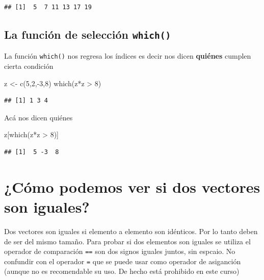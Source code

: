 \documentclass[
]{book}
\newenvironment{Shaded}{\begin{snugshade}}{\end{snugshade}}
\newcommand{\DecValTok}[1]{\textcolor[rgb]{0.00,0.00,0.81}{#1}}
\newcommand{\FunctionTok}[1]{\textcolor[rgb]{0.00,0.00,0.00}{#1}}
\newcommand{\NormalTok}[1]{#1}
\newcommand{\OtherTok}[1]{\textcolor[rgb]{0.56,0.35,0.01}{#1}}
\newcommand{\SpecialCharTok}[1]{\textcolor[rgb]{0.00,0.00,0.00}{#1}}
\begin{document}
\begin{verbatim}
## [1]  5  7 11 13 17 19
\end{verbatim}

\hypertarget{la-funciuxf3n-de-selecciuxf3n-which}{%
\subsection{\texorpdfstring{La función de selección \texttt{which()}}{La función de selección which()}}\label{la-funciuxf3n-de-selecciuxf3n-which}}

La función \texttt{which()} nos regresa los índices es decir nos dicen \textbf{quiénes} cumplen cierta condición

\begin{Shaded}
\begin{Highlighting}[]
\NormalTok{z }\OtherTok{\textless{}{-}} \FunctionTok{c}\NormalTok{(}\DecValTok{5}\NormalTok{,}\DecValTok{2}\NormalTok{,}\SpecialCharTok{{-}}\DecValTok{3}\NormalTok{,}\DecValTok{8}\NormalTok{)}
\FunctionTok{which}\NormalTok{(z}\SpecialCharTok{*}\NormalTok{z }\SpecialCharTok{\textgreater{}} \DecValTok{8}\NormalTok{)}
\end{Highlighting}
\end{Shaded}

\begin{verbatim}
## [1] 1 3 4
\end{verbatim}

Acá nos dicen quiénes

\begin{Shaded}
\begin{Highlighting}[]
\NormalTok{z[}\FunctionTok{which}\NormalTok{(z}\SpecialCharTok{*}\NormalTok{z }\SpecialCharTok{\textgreater{}} \DecValTok{8}\NormalTok{)]}
\end{Highlighting}
\end{Shaded}

\begin{verbatim}
## [1]  5 -3  8
\end{verbatim}

\hypertarget{cuxf3mo-podemos-ver-si-dos-vectores-son-iguales}{%
\section{¿Cómo podemos ver si dos vectores son iguales?}\label{cuxf3mo-podemos-ver-si-dos-vectores-son-iguales}}

Dos vectores son iguales si elemento a elemento son idénticos.
Por lo tanto deben de ser del mismo tamaño. Para probar si dos elementos son iguales se utiliza el operador de comparación \texttt{==} son dos signos iguales juntos, sin espcaio. No confundir con el operador \texttt{=} que se puede usar como operador de asiganción (aunque no es recomendable su uso. De hecho está prohibido en este curso)
\end{document}
